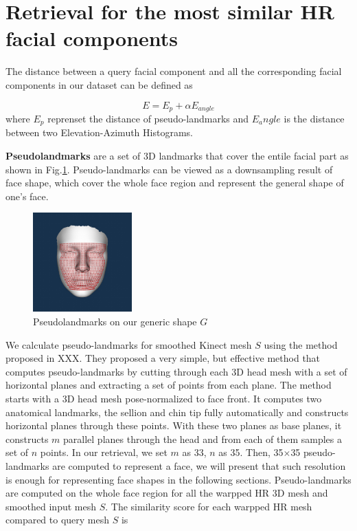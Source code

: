 \documentclass[annual]{acmsiggraph}
\begin{document}
\section{Retrieval for the most similar HR facial components}
The distance between a query facial component and all the corresponding facial components in our dataset can be defined as

\begin{equation}
E=E_p+{\alpha}E_{angle}
\end{equation}
where $E_p$ reprenset the distance of pseudo-landmarks and $E_angle$ is the distance between two Elevation-Azimuth Histograms.

\textbf{Pseudolandmarks} are a set of 3D landmarks that cover the entile facial part as shown in Fig.\ref{pseudolandmarks}. Pseudo-landmarks can be viewed as a downsampling result of face shape, which cover the whole face region and represent the general shape of one's face.
\begin{figure}[ht]
  \centering
  \includegraphics[width=1.5in]{images/pseudolandmarks}
  \caption{Pseudolandmarks on our generic shape $G$}\label{pseudolandmarks}
\end{figure}

We calculate pseudo-landmarks for smoothed Kinect mesh $S$ using the method proposed in XXX. They proposed a very simple, but effective method that computes pseudo-landmarks by cutting through each 3D head mesh with a set of horizontal planes and extracting a set of points from each plane. The method starts with a 3D head mesh pose-normalized to face front. It computes two anatomical landmarks, the sellion and chin tip fully automatically and constructs horizontal planes through these points. With these two planes as base planes, it constructs $m$ parallel planes through the head and from each of them samples a set of $n$ points. In our retrieval, we set $m$ as 33, $n$ as 35. Then, 35$\times$35 pseudo-landmarks are computed to represent a face, we will present that such resolution is enough for representing face shapes in the following sections.
Pseudo-landmarks are computed on the whole face region for all the warpped HR 3D mesh and smoothed input mesh $S$. The similarity score for each warpped HR mesh compared to query mesh $S$ is 
\end{document}
